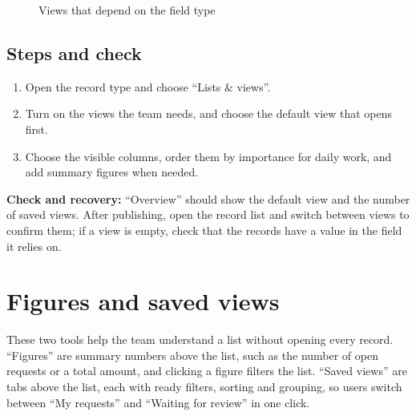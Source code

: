 \begin{figure}[H]
\centering
{}
\rclegend
\caption{Views that depend on the field type}
\label{fig:builder-lists-depends}
\end{figure}

\subsection{Steps and check}
\begin{enumerate}
\item Open the record type and choose “Lists \& views”.
\item Turn on the views the team needs, and choose the default view that opens first.
\item Choose the visible columns, order them by importance for daily work, and add summary figures when needed.
\end{enumerate}

\textbf{Check and recovery:} “Overview” should show the default view and the number of saved views. After publishing, open the record list and switch between views to confirm them; if a view is empty, check that the records have a value in the field it relies on.

\clearpage
\section{Figures and saved views}
\label{sec:builder-feature-figures-views}

These two tools help the team understand a list without opening every record. “Figures” are summary numbers above the list, such as the number of open requests or a total amount, and clicking a figure filters the list. “Saved views” are tabs above the list, each with ready filters, sorting and grouping, so users switch between “My requests” and “Waiting for review” in one click.

